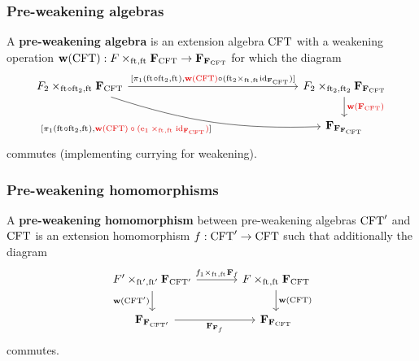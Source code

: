 \documentclass[handout]{beamer}
\newcommand\important[1]{\textbf{\color{red!90!black}#1}}
\begin{document}
\begin{frame}
\frametitle{\bf Pre-weakening algebras}
A \important{pre-weakening algebra} is an extension algebra $\mathrm{CFT}$ 
with a weakening operation 
$ \mathbf{w}(\stesys)
    :
  \cobesys{\stesysf}{\famesys{\stesys}}{\eft}{\eft}
    \to
  \famesys{\famesys{\stesys}}$
for which the diagram
\begin{equation*}
\begin{tikzcd}[ampersand replacement=\&,column sep=15em]
\cobesys{\stesysf_2}{\famesys{\stesys}}{\eft\circ\eft[2]}{\eft}
  \ar[bend right=10]{dr}[swap]%
    { [ \pullbackpr{1}{\eft\circ\eft[2]}{\eft},%
        \important{$
        \mathbf{w}(\stesys)%
          \circ%
        (\pullback{\efamext}{\catid{\famesys{\stesys}}}{\eft}{\eft})$}%
        ]%
      }
  \ar{r}{
    [ \pullbackpr{1}{\eft\circ\eft[2]}{\eft},%
      \important{$\mathbf{w}(\stesys)$}%
        \circ%
      (\pullback{\eft[2]}{\catid{\famesys{\stesys}}}{\eft}{\eft})%
      ]}%
  \&
\cobesys{\stesysf_2}{\famesys{\famesys{\stesys}}}{\eft[2]}{\eft[2]}
  \ar{d}{\important{$\mathbf{w}(\famesys{\stesys})$}}
  \\
  {}\&
\famesys{\famesys{\famesys{\stesys}}}
\end{tikzcd}
\end{equation*}
commutes (implementing currying for weakening).
\end{frame}

\begin{frame}
\frametitle{\bf Pre-weakening homomorphisms}
A \important{pre-weakening homomorphism} between pre-weakening algebras $\mathrm{CFT}'$ and $\mathrm{CFT}$ is an
extension homomorphism $f:\mathrm{CFT}'\to \mathrm{CFT}$ such that additionally the diagram
\begin{equation*}
\begin{tikzcd}[ampersand replacement=\&,column sep=large]
\cobesys{\stesysf'}{\famesys{\stesys'}}{\eft'}{\eft'}
  \ar{d}[swap]{\mathbf{w}(\stesys')}
  \ar{r}{\pullback{f_1}{\famehom{f}}{\eft}{\eft}}
  \&
\cobesys{\stesysf}{\famesys{\stesys}}{\eft}{\eft}
  \ar{d}{\mathbf{w}(\stesys)}
  \\
\famesys{\famesys{\stesys'}}
  \ar{r}[swap]{\famehom{\famehom{f}}}
  \&
\famesys{\famesys{\stesys}}
\end{tikzcd}
\end{equation*}
commutes.
\end{frame}
\end{document}
